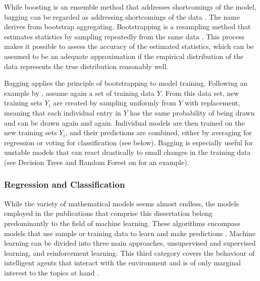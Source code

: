 \noindent While \label{mar:bagging} boosting is an
ensemble method that addresses shortcomings of the model, bagging can be
regarded as addressing shortcomings of the data \citep{Breiman1996}. The name
 derives from bootstrap aggregating. Bootstrapping is a
resampling method that estimates statistics by sampling repeatedly from the
same data \citep{Efron1994}. This process makes it possible to assess the
accuracy of the estimated statistics, which can be assumed to be an adequate
approximation if the empirical distribution of the data represents the true
distribution reasonably well.

Bagging applies the principle of bootstrapping to model training. Following an
example by \citet{Aslam2007}, assume again a set of training data $Y\!$. From
this data set, new training sets $Y_{i}$ are created by sampling uniformly
from $Y\!$ with replacement, meaning that each individual entry in $Y\!$ has
the same probability of being drawn and can be drawn again and again.
Individual models are then trained on the new training sets $Y_{i}$, and their
predictions are combined, either by averaging for regression or voting for
classification (see  below). Bagging is especially
useful for unstable models that can react drastically to small changes in the
training data (see Decision Trees and Random Forest on 
for an example).


\subsubsection{Regression and Classification}\label{subsubsec:regclas}
While the variety of mathematical models seems almost endless, the models
employed in the publications that comprise this dissertation belong
predominantly to the field of machine learning. These algorithms encompass
models that use sample or training data to learn and make predictions \citep{%
Mitchell}. Machine learning can be divided into three main approaches,
unsupervised and supervised learning, and reinforcement learning. This third
category covers the behaviour of intelligent agents that interact with the
environment and is of only marginal interest to the topics at hand \citep{%
Joshi2021a}.

